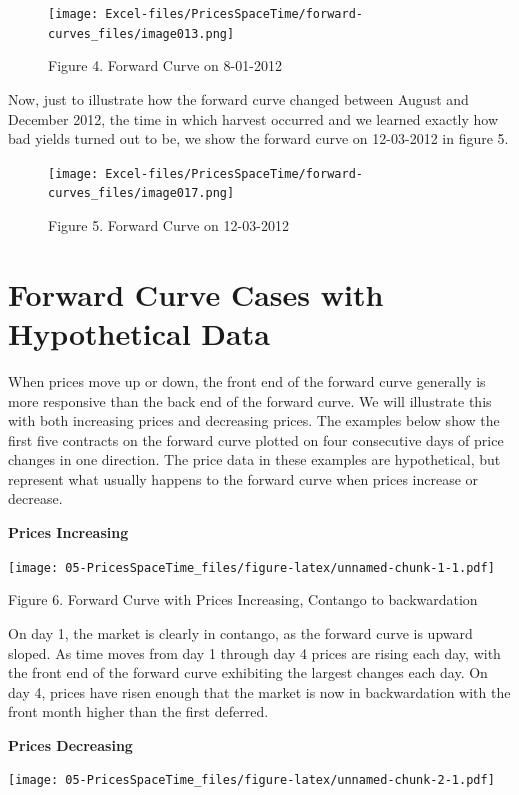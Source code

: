 \documentclass[
]{book}
\begin{document}
\begin{figure}
\centering
\texttt{[image: Excel-files/PricesSpaceTime/forward-curves\_files/image013.png]}
\caption{Figure 4. Forward Curve on 8-01-2012}
\end{figure}

Now, just to illustrate how the forward curve changed between August and December 2012, the time in which harvest occurred and we learned exactly how bad yields turned out to be, we show the forward curve on 12-03-2012 in figure 5.

\begin{figure}
\centering
\texttt{[image: Excel-files/PricesSpaceTime/forward-curves\_files/image017.png]}
\caption{Figure 5. Forward Curve on 12-03-2012}
\end{figure}

\hypertarget{forward-curve-cases-with-hypothetical-data}{%
\section{Forward Curve Cases with Hypothetical Data}\label{forward-curve-cases-with-hypothetical-data}}

When prices move up or down, the front end of the forward curve generally is more responsive than the back end of the forward curve. We will illustrate this with both increasing prices and decreasing prices. The examples below show the first five contracts on the forward curve plotted on four consecutive days of price changes in one direction. The price data in these examples are hypothetical, but represent what usually happens to the forward curve when prices increase or decrease.

\textbf{Prices Increasing}

\texttt{[image: 05-PricesSpaceTime\_files/figure-latex/unnamed-chunk-1-1.pdf]}

Figure 6. Forward Curve with Prices Increasing, Contango to backwardation

On day 1, the market is clearly in contango, as the forward curve is upward sloped. As time moves from day 1 through day 4 prices are rising each day, with the front end of the forward curve exhibiting the largest changes each day. On day 4, prices have risen enough that the market is now in backwardation with the front month higher than the first deferred.

\textbf{Prices Decreasing}

\texttt{[image: 05-PricesSpaceTime\_files/figure-latex/unnamed-chunk-2-1.pdf]}
\end{document}
